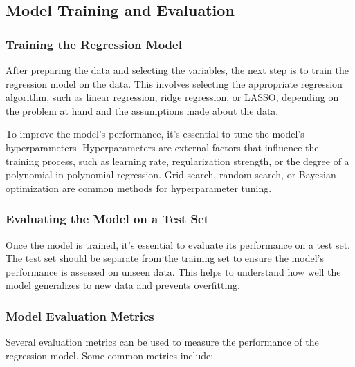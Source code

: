 \documentclass{beamer}
\begin{document}
\subsection{Model Training and Evaluation}

\subsubsection{Training the Regression Model}
After preparing the data and selecting the variables, the next step is to train the regression model on the data. This involves selecting the appropriate regression algorithm, such as linear regression, ridge regression, or LASSO, depending on the problem at hand and the assumptions made about the data.

To improve the model's performance, it's essential to tune the model's hyperparameters. Hyperparameters are external factors that influence the training process, such as learning rate, regularization strength, or the degree of a polynomial in polynomial regression. Grid search, random search, or Bayesian optimization are common methods for hyperparameter tuning.

\subsubsection{Evaluating the Model on a Test Set}
Once the model is trained, it's essential to evaluate its performance on a test set. The test set should be separate from the training set to ensure the model's performance is assessed on unseen data. This helps to understand how well the model generalizes to new data and prevents overfitting.

\subsubsection{Model Evaluation Metrics}
Several evaluation metrics can be used to measure the performance of the regression model. Some common metrics include:
\end{document}
